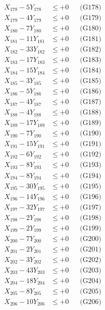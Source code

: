 \documentclass[a4paper,10pt]{article}
\begin{document}
{\begin{align}
X_{178} - 5Y_{178} &\leq +0 && \text{(G178)} \\
X_{179} - 4Y_{179} &\leq +0 && \text{(G179)} \\
X_{180} - 7Y_{180} &\leq +0 && \text{(G180)} \\
X_{181} - 11Y_{181} &\leq +0 && \text{(G181)} \\
X_{182} - 33Y_{182} &\leq +0 && \text{(G182)} \\
X_{183} - 17Y_{183} &\leq +0 && \text{(G183)} \\
\allowbreak
X_{184} - 15Y_{184} &\leq +0 && \text{(G184)} \\
X_{185} - 3Y_{185} &\leq +0 && \text{(G185)} \\
X_{186} - 5Y_{186} &\leq +0 && \text{(G186)} \\
X_{187} - 4Y_{187} &\leq +0 && \text{(G187)} \\
X_{188} - 4Y_{188} &\leq +0 && \text{(G188)} \\
X_{189} - 17Y_{189} &\leq +0 && \text{(G189)} \\
X_{190} - 7Y_{190} &\leq +0 && \text{(G190)} \\
X_{191} - 15Y_{191} &\leq +0 && \text{(G191)} \\
X_{192} - 6Y_{192} &\leq +0 && \text{(G192)} \\
X_{193} - 8Y_{193} &\leq +0 && \text{(G193)} \\
\allowbreak
X_{194} - 8Y_{194} &\leq +0 && \text{(G194)} \\
X_{195} - 30Y_{195} &\leq +0 && \text{(G195)} \\
X_{196} - 14Y_{196} &\leq +0 && \text{(G196)} \\
X_{197} - 32Y_{197} &\leq +0 && \text{(G197)} \\
X_{198} - 2Y_{198} &\leq +0 && \text{(G198)} \\
X_{199} - 2Y_{199} &\leq +0 && \text{(G199)} \\
X_{200} - 7Y_{200} &\leq +0 && \text{(G200)} \\
X_{201} - 2Y_{201} &\leq +0 && \text{(G201)} \\
X_{202} - 3Y_{202} &\leq +0 && \text{(G202)} \\
X_{203} - 43Y_{203} &\leq +0 && \text{(G203)} \\
\allowbreak
X_{204} - 18Y_{204} &\leq +0 && \text{(G204)} \\
X_{205} - 8Y_{205} &\leq +0 && \text{(G205)} \\
X_{206} - 10Y_{206} &\leq +0 && \text{(G206)} \\

\end{align}}
\end{document}
